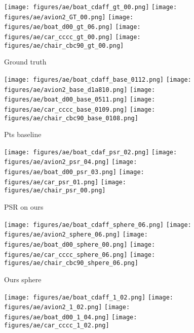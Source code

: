 \documentclass[10pt,twocolumn,letterpaper]{article}
\begin{document}
\begin{figure*}[t!]
\centering
\begin{subfigure}[b]{0.12\linewidth}
\centering
 \texttt{[image: figures/ae/boat\_cdaff\_gt\_00.png]}
 \texttt{[image: figures/ae/avion2\_GT\_00.png]}
\texttt{[image: figures/ae/boat\_d00\_gt\_06.png]}
 \texttt{[image: figures/ae/car\_cccc\_gt\_00.png]}
 \texttt{[image: figures/ae/chair\_cbc90\_gt\_00.png]}
\caption{Ground truth}
\end{subfigure}
\begin{subfigure}[b]{0.12\linewidth}
\centering
 \texttt{[image: figures/ae/boat\_cdaff\_base\_0112.png]}
 \texttt{[image: figures/ae/avion2\_base\_d1a810.png]}
\texttt{[image: figures/ae/boat\_d00\_base\_0511.png]}
 \texttt{[image: figures/ae/car\_cccc\_base\_0109.png]}
 \texttt{[image: figures/ae/chair\_cbc90\_base\_0108.png]}
\caption{Pts baseline}
\label{fig:ae_comparison_base}
\end{subfigure}
\begin{subfigure}[b]{0.12\linewidth}
\centering
 \texttt{[image: figures/ae/boat\_cdaf\_psr\_02.png]}
 \texttt{[image: figures/ae/avion2\_psr\_04.png]}
\texttt{[image: figures/ae/boat\_d00\_psr\_03.png]}
 \texttt{[image: figures/ae/car\_psr\_01.png]}
 \texttt{[image: figures/ae/chair\_psr\_00.png]}
\caption{PSR on ours}
\label{fig:ae_comparison_psr}
\end{subfigure}
\begin{subfigure}[b]{0.12\linewidth}
\centering
 \texttt{[image: figures/ae/boat\_cdaff\_sphere\_06.png]}
 \texttt{[image: figures/ae/avion2\_sphere\_06.png]}
\texttt{[image: figures/ae/boat\_d00\_sphere\_00.png]}
 \texttt{[image: figures/ae/car\_cccc\_sphere\_06.png]}
 \texttt{[image: figures/ae/chair\_cbc90\_shpere\_06.png]}
\caption{Ours sphere}
\end{subfigure}
\begin{subfigure}[b]{0.12\linewidth}
\centering
 \texttt{[image: figures/ae/boat\_cdaff\_1\_02.png]}
 \texttt{[image: figures/ae/avion2\_1\_02.png]}
\texttt{[image: figures/ae/boat\_d00\_1\_04.png]}
 \texttt{[image: figures/ae/car\_cccc\_1\_02.png]}

\end{subfigure}
\end{figure*}
\end{document}
